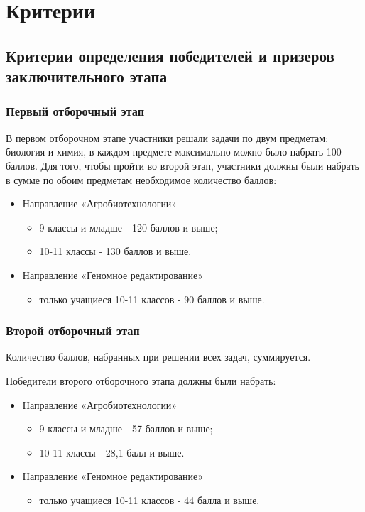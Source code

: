 \part{Критерии}

\chapter{Критерии определения победителей и призеров заключительного этапа}
 
\section{Первый отборочный этап}

В первом отборочном этапе участники решали задачи по двум предметам: биология и химия, в каждом предмете максимально можно было набрать 100 баллов. Для того, чтобы пройти во второй этап, участники должны были набрать в сумме по обоим предметам необходимое количество баллов:
\begin{itemize}
    \item Направление «Агробиотехнологии»
    \begin{itemize}
        \item 9 классы и младше - 120 баллов и выше;
        \item 10-11 классы - 130 баллов и выше.
    \end{itemize}
    \item Направление «Геномное редактирование»
    \begin{itemize}
        \item только учащиеся 10-11 классов - 90 баллов и выше.
    \end{itemize}
\end{itemize}

\section{Второй отборочный этап}

Количество баллов, набранных при решении всех задач, суммируется. 

Победители второго отборочного этапа должны были набрать:
\begin{itemize}
    \item Направление «Агробиотехнологии»
    \begin{itemize}
        \item 9 классы и младше - 57 баллов и выше;
        \item 10-11 классы - 28,1 балл и выше.
    \end{itemize}
    \item Направление «Геномное редактирование» 
    \begin{itemize}
        \item только учащиеся 10-11 классов - 44 балла и выше.
    \end{itemize}
\end{itemize}

